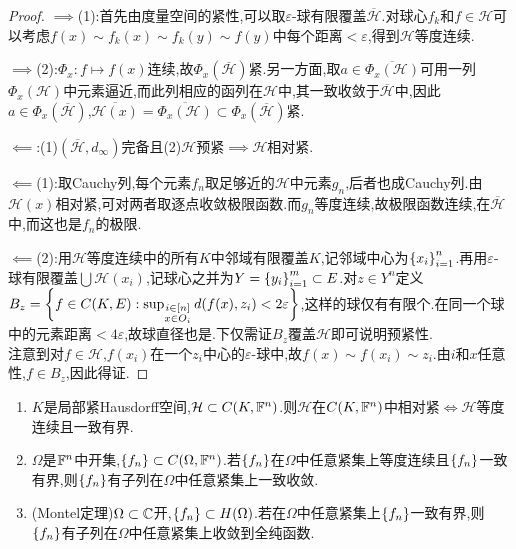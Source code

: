 \documentclass{article}
\begin{document}
\begin{proof}
    $\implies$(1):首先由度量空间的紧性,可以取$\varepsilon$-球有限覆盖$\overline{\mathcal{H}}$.对球心$f_k$和$f\in \mathcal{H}$可以考虑$f(x)\sim f_k(x)\sim f_k(y)\sim f(y)$中每个距离$<\varepsilon$,得到$\mathcal{H}$等度连续.

    $\implies$(2):$\Phi_x:f\mapsto f(x)$连续,故$\Phi_x(\overline{\mathcal{H}})$紧.另一方面,取$a\in\overline{\Phi_x(\mathcal{H})}$可用一列$\Phi_x(\mathcal{H})$中元素逼近,而此列相应的函列在$\mathcal{H}$中,其一致收敛于$\overline{\mathcal{H}}$中,因此$a\in\Phi_x(\overline{\mathcal{H}})$,$\overline{\mathcal{H}(x)}=\overline{\Phi_x(\mathcal{H})}\subset \Phi_x(\overline{\mathcal{H}})$紧.

    $\impliedby$:(1)$(\overline{\mathcal{H}},d_\infty)$完备且(2)$\mathcal{H}$预紧$\implies\mathcal{H}$相对紧.

    $\impliedby$(1):取Cauchy列,每个元素$f_n$取足够近的$\mathcal{H}$中元素$g_n$,后者也成Cauchy列.由$\mathcal{H}(x)$相对紧,可对两者取逐点收敛极限函数.而$g_n$等度连续,故极限函数连续,在$\overline{\mathcal{H}}$中,而这也是$f_n$的极限.

    $\impliedby$(2):用$\mathcal{H}$等度连续中的所有$K$中邻域有限覆盖$K$,记邻域中心为$\left\{x_i\right\}_{i=1}^n$.再用$\varepsilon$-球有限覆盖$\bigcup\mathcal{H}(x_i)$,记球心之并为$Y=\left\{y_i\right\}_{i=1}^m\subset E$.对$z\in Y^n$定义$B_z=\left\{f\in C(K,E):\sup_{\substack{i\in [n]\\x\in O_i}}d(f(x),z_i)<2\varepsilon\right\}$,这样的球仅有有限个.在同一个球中的元素距离$<4\varepsilon$,故球直径也是.下仅需证$B_z$覆盖$\mathcal{H}$即可说明预紧性.\\
    注意到对$f\in\mathcal{H}$,$f(x_i)$在一个$z_i$中心的$\varepsilon$-球中,故$f(x)\sim f(x_i)\sim z_i$.由$i$和$x$任意性,$f\in B_z$,因此得证.
\end{proof}

\begin{enumerate}[resume]
    \item $K$是局部紧Hausdorff空间,$\mathcal{H}\subset C(K,\mathbb{F}^n)$.则$\mathcal{H}$在$C(K,\mathbb{F}^n)$中相对紧$\iff \mathcal{H}$等度连续且一致有界.
    \item $\Omega$是$\mathbb{F}^n$中开集,$\left\{f_n\right\}\subset C(\Omega,\mathbb{F}^n)$.若$\left\{f_n\right\}$在$\Omega$中任意紧集上等度连续且$\left\{f_n\right\}$一致有界,则$\left\{f_n\right\}$有子列在$\Omega$中任意紧集上一致收敛.\\
    \item (Montel定理)$\Omega\subset\mathbb{C}$开,$\left\{f_n\right\}\subset H(\Omega)$.若在$\Omega$中任意紧集上$\left\{f_n\right\}$一致有界,则$\left\{f_n\right\}$有子列在$\Omega$中任意紧集上收敛到全纯函数.\\
\end{enumerate}
\end{document}
